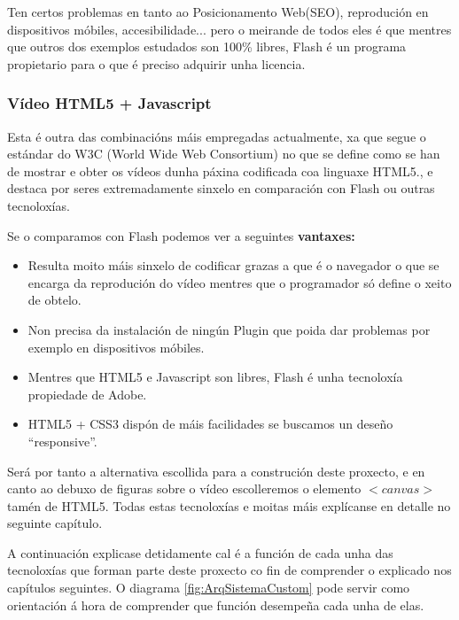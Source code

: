             Ten certos problemas en tanto ao Posicionamento Web(SEO), reprodución en 
            dispositivos móbiles, accesibilidade... pero o meirande de todos eles é que mentres
            que outros dos exemplos estudados son 100\% libres, Flash é un programa propietario
            para o que é preciso adquirir unha licencia.        
            
        
        \subsubsection{Vídeo HTML5 + Javascript}
            Esta é outra das combinacións máis empregadas actualmente, xa que segue o estándar
            do W3C (World Wide Web Consortium)\cite{w3schools-video-tag} no que se define como se
            han de mostrar e obter os vídeos dunha páxina codificada coa linguaxe HTML5., e 
            destaca por seres extremadamente sinxelo en comparación con Flash ou outras tecnoloxías.
            
            Se o comparamos con Flash podemos ver a seguintes \textbf{vantaxes:}
            \begin{itemize}
                \item Resulta moito máis sinxelo de codificar grazas a que é o navegador o que se 
                encarga da reprodución do vídeo mentres que o programador só define o xeito de obtelo.
                \item Non precisa da instalación de ningún Plugin que poida dar problemas por exemplo 
                en dispositivos móbiles.
                \item Mentres que HTML5 e Javascript son libres, Flash é unha tecnoloxía propiedade de 
                Adobe.
                \item HTML5 + CSS3 dispón de máis facilidades se buscamos un deseño ``responsive''.
            \end{itemize}

            Será por tanto a alternativa escollida para a construción deste proxecto, e en canto ao 
            debuxo de figuras sobre o vídeo escolleremos o elemento $<canvas>$ tamén de HTML5. Todas
            estas tecnoloxías e moitas máis explícanse en detalle no seguinte capítulo.
            
    
    
    
    A continuación explicase detidamente cal é a función de cada unha das tecnoloxías que forman 
    parte deste proxecto co fin de comprender o explicado nos capítulos seguintes. O diagrama 
    \ref{fig:ArqSistemaCustom} pode servir como orientación á hora de comprender que función 
    desempeña cada unha de elas.
    

